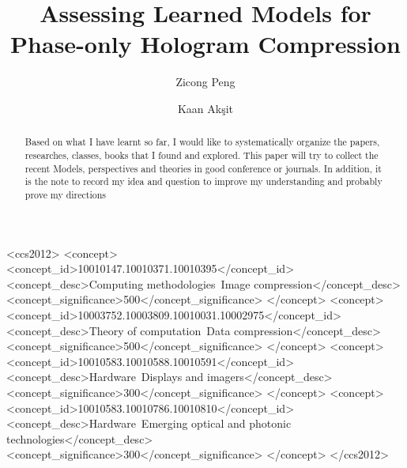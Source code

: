 \documentclass[sigconf, screen]{acmart}
\begin{document}
\title{Assessing Learned Models for Phase-only Hologram Compression}

\author{Zicong Peng}


\author{Kaan Akşit}

\renewcommand{\shortauthors}{Peng et al.}


\begin{abstract}
   Based on what I have learnt so far, I would like to systematically organize 
   the papers, researches, classes, books that I found and explored. This paper
   will try to collect the recent Models, perspectives and theories in good conference or journals.
   In addition, it is the note to record my idea and question to improve my understanding and probably prove my directions
\end{abstract}

\begin{CCSXML}
<ccs2012>
   <concept>
       <concept_id>10010147.10010371.10010395</concept_id>
       <concept_desc>Computing methodologies~Image compression</concept_desc>
       <concept_significance>500</concept_significance>
       </concept>
   <concept>
       <concept_id>10003752.10003809.10010031.10002975</concept_id>
       <concept_desc>Theory of computation~Data compression</concept_desc>
       <concept_significance>500</concept_significance>
       </concept>
   <concept>
       <concept_id>10010583.10010588.10010591</concept_id>
       <concept_desc>Hardware~Displays and imagers</concept_desc>
       <concept_significance>300</concept_significance>
       </concept>
   <concept>
       <concept_id>10010583.10010786.10010810</concept_id>
       <concept_desc>Hardware~Emerging optical and photonic technologies</concept_desc>
       <concept_significance>300</concept_significance>
       </concept>
 </ccs2012>
\end{CCSXML}


\end{document}
